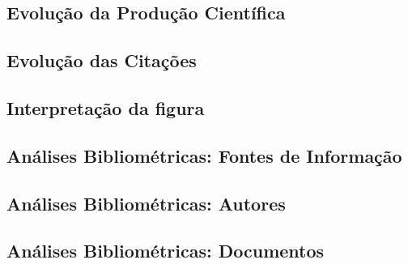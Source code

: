      
\subsection{Evolução da Produção Científica}
     

\subsection{Evolução das Citações}
\subsection{Interpretação da figura}

\subsection{Análises Bibliométricas: Fontes de Informação}

\subsection{Análises Bibliométricas: Autores}

\subsection{Análises Bibliométricas: Documentos}